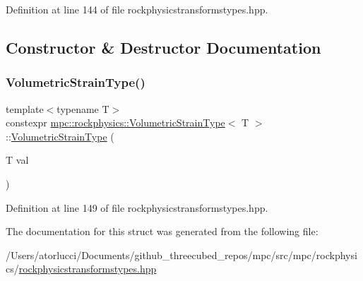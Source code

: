 Definition at line 144 of file rockphysicstransformstypes.\+hpp.



\subsection{Constructor \& Destructor Documentation}
\mbox{\label{structmpc_1_1rockphysics_1_1_volumetric_strain_type_a08a9f46af054ba13d45c3d376e2995f6}} 
\subsubsection{\texorpdfstring{Volumetric\+Strain\+Type()}{VolumetricStrainType()}}
{\footnotesize\ttfamily template$<$typename T$>$ \\
constexpr \mbox{\hyperlink{structmpc_1_1rockphysics_1_1_volumetric_strain_type}{mpc\+::rockphysics\+::\+Volumetric\+Strain\+Type}}$<$ T $>$\+::\mbox{\hyperlink{structmpc_1_1rockphysics_1_1_volumetric_strain_type}{Volumetric\+Strain\+Type}} (\begin{DoxyParamCaption}\item[{T}]{val }\end{DoxyParamCaption})\hspace{0.3cm}{\ttfamily [inline]}}



Definition at line 149 of file rockphysicstransformstypes.\+hpp.



The documentation for this struct was generated from the following file\+:\begin{DoxyCompactItemize}
\item 
/\+Users/atorlucci/\+Documents/github\+\_\+threecubed\+\_\+repos/mpc/src/mpc/rockphysics/\mbox{\hyperlink{rockphysicstransformstypes_8hpp}{rockphysicstransformstypes.\+hpp}}\end{DoxyCompactItemize}
